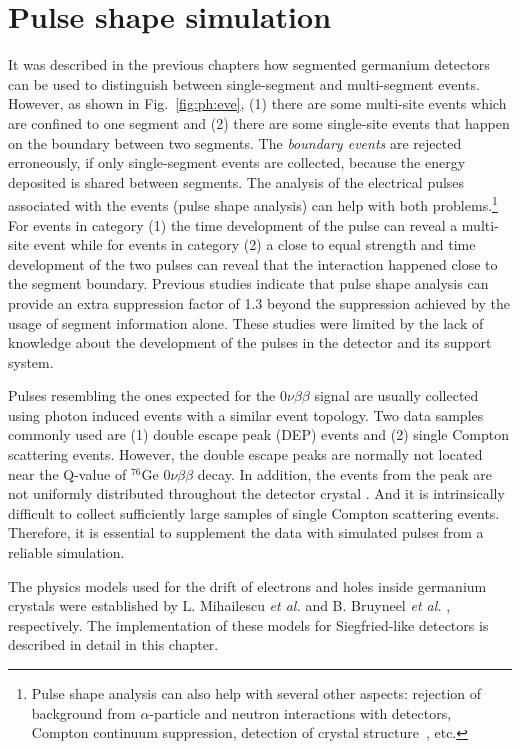 \chapter{Pulse shape simulation}
\label{cha:pss}
It was described in the previous chapters how segmented germanium detectors can be used to distinguish between single-segment and multi-segment events. However, as shown in Fig.~\ref{fig:ph:eve}, (1) there are some multi-site events which are confined to one segment and (2) there are some single-site events that happen on the boundary between two segments. The \textit{boundary events} are rejected erroneously, if only single-segment events are collected, because the energy deposited is shared between segments. The analysis of the electrical pulses associated with the events (pulse shape analysis) can help with both problems.\footnote{Pulse shape analysis can also help with several other aspects: rejection of background from $\alpha$-particle and neutron interactions with detectors, Compton continuum suppression\cite{comcon}, detection of crystal structure~\cite{agata}, etc.} For events in category (1) the time development of the pulse can reveal a multi-site event while for events in category (2) a close to equal strength and time development of the two pulses can reveal that the interaction happened close to the segment boundary. Previous studies \cite{Kev07} indicate that pulse shape analysis can provide an extra suppression factor of 1.3 beyond the suppression achieved by the usage of segment information alone.
These studies were limited by the lack of knowledge about the development of the  pulses in the detector and its support system.

Pulses resembling the ones expected for the $0\nu\beta\beta$ signal are usually collected using photon induced events with a similar event topology. Two data samples commonly used are (1) double escape peak (DEP) events and (2) single Compton scattering events\cite{scoms}. However, the double escape peaks are normally not located near the Q-value of $^{76}$Ge $0\nu\beta\beta$ decay. In addition, the events from the peak are not uniformly distributed throughout the detector crystal \cite{major}. And it is intrinsically difficult to collect sufficiently large samples of single Compton scattering events. Therefore, it is essential to supplement the data with simulated pulses from a reliable simulation.

The physics models used for the drift of electrons and holes inside germanium crystals were established by L. Mihailescu \textit{et al.}\cite{miha} and B. Bruyneel \emph{et al.} \cite{bart}, respectively. The implementation of these models for Siegfried-like detectors is described in detail in this chapter.


